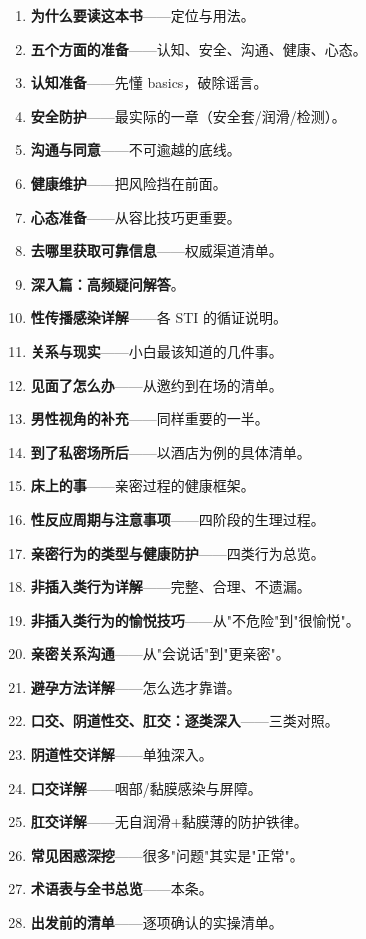 \begin{enumerate}[leftmargin=2em,itemsep=0.3em]
  \item \textbf{为什么要读这本书}——定位与用法。
  \item \textbf{五个方面的准备}——认知、安全、沟通、健康、心态。
  \item \textbf{认知准备}——先懂 basics，破除谣言。
  \item \textbf{安全防护}——最实际的一章（安全套/润滑/检测）。
  \item \textbf{沟通与同意}——不可逾越的底线。
  \item \textbf{健康维护}——把风险挡在前面。
  \item \textbf{心态准备}——从容比技巧更重要。
  \item \textbf{去哪里获取可靠信息}——权威渠道清单。
  \item \textbf{深入篇：高频疑问解答}。
  \item \textbf{性传播感染详解}——各 STI 的循证说明。
  \item \textbf{关系与现实}——小白最该知道的几件事。
  \item \textbf{见面了怎么办}——从邀约到在场的清单。
  \item \textbf{男性视角的补充}——同样重要的一半。
  \item \textbf{到了私密场所后}——以酒店为例的具体清单。
  \item \textbf{床上的事}——亲密过程的健康框架。
  \item \textbf{性反应周期与注意事项}——四阶段的生理过程。
  \item \textbf{亲密行为的类型与健康防护}——四类行为总览。
  \item \textbf{非插入类行为详解}——完整、合理、不遗漏。
  \item \textbf{非插入类行为的愉悦技巧}——从"不危险"到"很愉悦"。
  \item \textbf{亲密关系沟通}——从"会说话"到"更亲密"。
  \item \textbf{避孕方法详解}——怎么选才靠谱。
  \item \textbf{口交、阴道性交、肛交：逐类深入}——三类对照。
  \item \textbf{阴道性交详解}——单独深入。
  \item \textbf{口交详解}——咽部/黏膜感染与屏障。
  \item \textbf{肛交详解}——无自润滑+黏膜薄的防护铁律。
  \item \textbf{常见困惑深挖}——很多"问题"其实是"正常"。
  \item \textbf{术语表与全书总览}——本条。
  \item \textbf{出发前的清单}——逐项确认的实操清单。
\end{enumerate}

